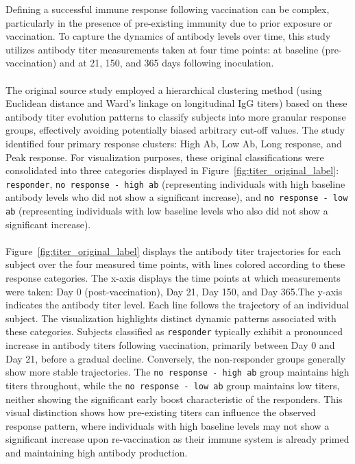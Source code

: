 \documentclass[12pt,a4paper]{report}
\begin{document}
\noindent
Defining a successful immune response following vaccination can be complex, particularly in the presence of pre-existing immunity due to prior exposure or vaccination. To capture the dynamics of antibody levels over time, this study utilizes antibody titer measurements taken at four time points: at baseline (pre-vaccination) and at 21, 150, and 365 days following inoculation.\\
\\
The original source study \cite{bartholomeus2020transcriptomic} employed a hierarchical clustering method (using Euclidean distance and Ward's linkage on longitudinal IgG titers) based on these antibody titer evolution patterns to classify subjects into more granular response groups, effectively avoiding potentially biased arbitrary cut-off values. The study identified four primary response clusters: High Ab, Low Ab, Long response, and Peak response.
For visualization purposes, these original classifications were consolidated into three categories displayed in Figure~\ref{fig:titer_original_label}: \texttt{responder}, \texttt{no response - high ab} (representing individuals with high baseline antibody levels who did not show a significant increase), and \texttt{no response - low ab} (representing individuals with low baseline levels who also did not show a significant increase).\\
\\
Figure~\ref{fig:titer_original_label} displays the antibody titer trajectories for each subject over the four measured time points, with lines colored according to these response categories. The x-axis displays the time points at which measurements were taken: Day 0 (post-vaccination), Day 21, Day 150, and Day 365.The y-axis indicates the antibody titer level. Each line follows the trajectory of an individual subject. The visualization highlights distinct dynamic patterns associated with these categories. Subjects classified as \texttt{responder} typically exhibit a pronounced increase in antibody titers following vaccination, primarily between Day 0 and Day 21, before a gradual decline. Conversely, the non-responder groups generally show more stable trajectories. The \texttt{no response - high ab} group maintains high titers throughout, while the \texttt{no response - low ab} group maintains low titers, neither showing the significant early boost characteristic of the responders. This visual distinction shows how pre-existing titers can influence the observed response pattern, where individuals with high baseline levels may not show a significant increase upon re-vaccination as their immune system is already primed and maintaining high antibody production.\\
\end{document}
